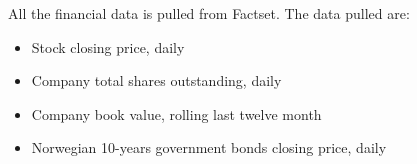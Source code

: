All the financial data is pulled from Factset. The data pulled are:
\begin{itemize}
    \item Stock closing price, daily
    \item Company total shares outstanding, daily
    \item Company book value, rolling last twelve month
    \item Norwegian 10-years government bonds closing price, daily
\end{itemize}

